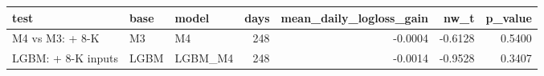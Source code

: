 \begin{tabular}{lllrrrr}
\toprule
test & base & model & days & mean\_daily\_logloss\_gain & nw\_t & p\_value \\
\midrule
M4 vs M3: + 8-K & M3 & M4 & 248 & -0.0004 & -0.6128 & 0.5400 \\
LGBM: + 8-K inputs & LGBM & LGBM\_M4 & 248 & -0.0014 & -0.9528 & 0.3407 \\
\bottomrule
\end{tabular}
